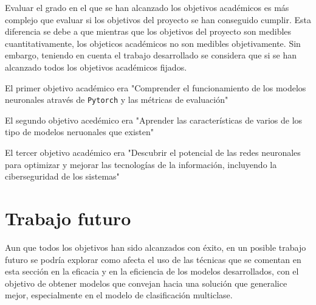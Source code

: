 Evaluar el grado en el que se han alcanzado los objetivos académicos es más complejo que evaluar si los objetivos del proyecto se han conseguido cumplir. Esta diferencia se debe a que mientras que los objetivos del proyecto son medibles cuantitativamente, los objeticos académicos no son medibles objetivamente. Sin embargo, teniendo en cuenta el trabajo desarrollado se considera que si se han alcanzado todos los objetivos académicos fijados.

El primer objetivo académico era "Comprender el funcionamiento de los modelos neuronales através de \texttt{Pytorch} y las métricas de evaluación"

El segundo objetivo acedémico era "Aprender las características de varios de los tipo de modelos neruonales que existen"


El tercer objetivo académico era "Descubrir el potencial de las redes neuronales para optimizar y mejorar las tecnologías de la información, incluyendo la ciberseguridad de los sistemas"



\section{Trabajo futuro}
Aun que todos los objetivos han sido alcanzados con éxito, en un posible trabajo futuro se podría explorar como afecta el uso de las técnicas que se comentan en esta sección en la eficacia y en la eficiencia de los modelos desarrollados, con el objetivo de obtener modelos que convejan hacia una solución que generalice mejor, especialmente en el modelo de clasificación multiclase.

